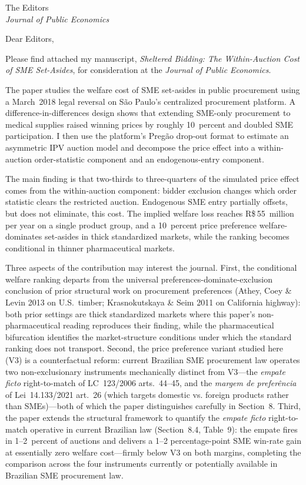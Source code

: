 \documentclass[11pt]{letter}
\begin{document}
\begin{letter}{The Editors\\\emph{Journal of Public Economics}}

\opening{Dear Editors,}

Please find attached my manuscript, \emph{Sheltered Bidding: The Within-Auction Cost of SME Set-Asides}, for consideration at the \emph{Journal of Public Economics}.

The paper studies the welfare cost of SME set-asides in public procurement using a March~2018 legal reversal on São Paulo's centralized procurement platform. A difference-in-differences design shows that extending SME-only procurement to medical supplies raised winning prices by roughly 10~percent and doubled SME participation. I then use the platform's Pregão drop-out format to estimate an asymmetric IPV auction model and decompose the price effect into a within-auction order-statistic component and an endogenous-entry component.

The main finding is that two-thirds to three-quarters of the simulated price effect comes from the within-auction component: bidder exclusion changes which order statistic clears the restricted auction. Endogenous SME entry partially offsets, but does not eliminate, this cost. The implied welfare loss reaches R\$\,55~million per year on a single product group, and a 10~percent price preference welfare-dominates set-asides in thick standardized markets, while the ranking becomes conditional in thinner pharmaceutical markets.

Three aspects of the contribution may interest the journal. First, the conditional welfare ranking departs from the universal preferences-dominate-exclusion conclusion of prior structural work on procurement preferences (Athey, Coey \& Levin 2013 on U.S.\ timber; Krasnokutskaya \& Seim 2011 on California highway): both prior settings are thick standardized markets where this paper's non-pharmaceutical reading reproduces their finding, while the pharmaceutical bifurcation identifies the market-structure conditions under which the standard ranking does not transport. Second, the price preference variant studied here (V3) is a counterfactual reform: current Brazilian SME procurement law operates two non-exclusionary instruments mechanically distinct from V3---the \emph{empate ficto} right-to-match of LC~123/2006 arts.~44--45, and the \emph{margem de prefer\^encia} of Lei~14.133/2021 art.~26 (which targets domestic vs. foreign products rather than SMEs)---both of which the paper distinguishes carefully in Section~8. Third, the paper extends the structural framework to quantify the \emph{empate ficto} right-to-match operative in current Brazilian law (Section~8.4, Table~9): the empate fires in 1--2~percent of auctions and delivers a 1--2 percentage-point SME win-rate gain at essentially zero welfare cost---firmly below V3 on both margins, completing the comparison across the four instruments currently or potentially available in Brazilian SME procurement law.


\end{letter}
\end{document}
